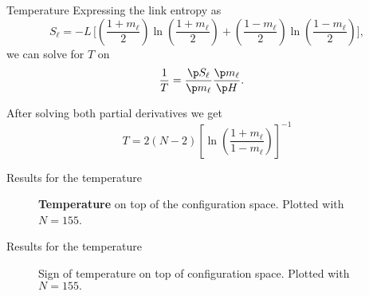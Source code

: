 \begin{frame}{Temperature}
Expressing the link entropy as
\begin{equation}
        S_\ell = - L\, \Biggr[\left(\frac{1+m_\ell}{2}\right) \ln\left(\frac{1+m_\ell}{2}\right) + \left(\frac{1-m_\ell}{2}\right)\ln \left(\frac{1-m_\ell}{2}\right)\Biggr]\label{eq:Sl_m},
\end{equation}
we can solve for $T$ on 
\begin{align*}
    \frac{1}{T} &= \frac{\p S_\ell}{\p m_\ell} \frac{\p m_\ell}{\p H}.
\end{align*}

After solving both partial derivatives we get 
\begin{equation}
	T = 2(N-2)\left[\ln \left(\frac{1+m_\ell}{1-m_\ell}\right) \right]^{-1}\label{eq:T_final}
\end{equation}

\end{frame}


\begin{frame}{Results for the temperature}
\vspace{-1mm}
\begin{figure}[h]
    \centering
	\vspace{-1mm}
    \caption{\textbf{Temperature} on top of the configuration space. Plotted with $N=155$.}
    \label{fig:Tps}
\end{figure}
\end{frame}

\begin{frame}{Results for the temperature}
\vspace{-1mm}
\begin{figure}[h]
    \centering
	\vspace{-1mm}
    \caption{Sign of temperature on top of configuration space. Plotted with $N=155.$}
    \label{fig:Tpos-neg}
\end{figure}
\end{frame}



